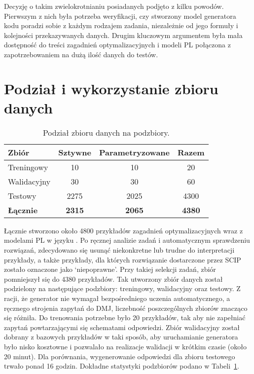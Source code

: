 Decyzję o takim zwielokrotnianiu posiadanych podjęto z kilku powodów. Pierwszym z nich była potrzeba weryfikacji, czy stworzony model generatora kodu  poradzi sobie z każdym rodzajem zadania, niezależnie od jego formuły i kolejności przekazywanych danych. Drugim kluczowym argumentem była mała dostępność do treści zagadnień optymalizacyjnych i modeli PL połączona z zapotrzebowaniem na dużą ilość danych do testów.

\section{Podział i wykorzystanie zbioru danych}

\begin{table}[H]
\caption{Podział zbioru danych na podzbiory.}\label{tab:dataset:stats}
\centering%
\begin{tabular}{|l|c|c|c|}
\hline
\textbf{Zbiór} & \textbf{Sztywne} & \textbf{Parametryzowane} & \textbf{Razem} \\
\hline
Treningowy & 10 & 10 & 20\\
\hline
Walidacyjny & 30 & 30 & 60\\
\hline
Testowy & 2275 & 2025 & 4300\\
\hline
\textbf{Łącznie} & \textbf{2315} & \textbf{2065} & \textbf{4380}\\
\hline
\end{tabular}
\end{table}

Łącznie stworzono około 4800 przykładów zagadnień optymalizacyjnych wraz z modelami PL w języku  . Po ręcznej analizie zadań i automatycznym sprawdzeniu rozwiązań, zdecydowano się usunąć niekonkretne lub trudne do interpretacji przykłady, a także przykłady, dla których rozwiązanie dostarczone przez SCIP zostało oznaczone jako `niepoprawne'. Przy takiej selekcji zadań, zbiór pomniejszył się do 4380 przykładów. Tak utworzony zbiór danych został podzielony na następujące podzbiory: treningowy, walidacyjny oraz testowy. Z racji, że generator nie wymagał bezpośredniego uczenia automatycznego, a ręcznego strojenia zapytań do DMJ, liczebność poszczególnych zbiorów znacząco się różniła. Do trenowania potrzebne było 20 przykładów, tak aby nie zapełniać zapytań powtarzającymi się schematami odpowiedzi. Zbiór walidacyjny został dobrany z bazowych przykładów w taki sposób, aby uruchamianie generatora było nisko kosztowne i pozwalało na realizacje walidacji w krótkim czasie (około 20 minut). Dla porównania, wygenerowanie odpowiedzi  dla zbioru testowego trwało ponad 16 godzin. Dokładne statystyki podzbiorów podano w Tabeli~\ref{tab:dataset:stats}. 

